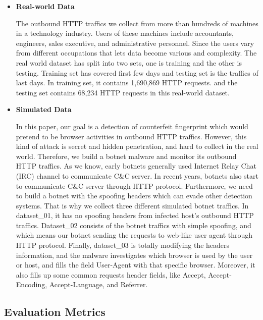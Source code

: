 \begin{itemize}

\item {\bf Real-world Data}

The outbound HTTP traffics we collect from more than hundreds of machines in a technology industry. Users of these machines include accountants, engineers, sales executive, and administrative personnel. Since the users vary from different occupations that lets data become various and complexity. The real world dataset has split into two sets, one is training and the other is testing. Training set has covered first few days and testing set is the traffics of last days. In training set, it contains 1,690,869 HTTP requests. and the testing set contains 68,234 HTTP requests in this real-world dataset.

\item {\bf Simulated Data}

In this paper, our goal is a detection of counterfeit fingerprint which would pretend to be browser activities in outbound HTTP traffics. However, this kind of attack is secret and hidden penetration, and hard to collect in the real world. Therefore, we build a botnet malware and monitor its outbound HTTP traffics. As we know, early botnets generally used Internet Relay Chat (IRC) channel to communicate C\&C server. In recent years, botnets also start to communicate C\&C server through HTTP protocol. Furthermore, we need to build a botnet with the spoofing headers which can evade other detection systems. That is why we collect three different simulated botnet traffics. In dataset\_01, it has no spoofing headers from infected host's outbound HTTP traffics. Dataset\_02 consists of the botnet traffics with simple spoofing, and which means our botnet sending the requests to web-like user agent through HTTP protocol. Finally, dataset\_03 is totally modifying the headers information, and the malware investigates which browser is used by the user or host, and fills the field User-Agent with that specific browser. Moreover, it also fills up some common requests header fields, like Accept, Accept-Encoding, Accept-Language, and Referrer.

\end{itemize}

\subsection{Evaluation Metrics}

